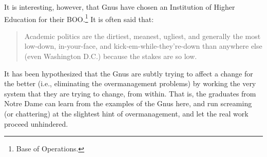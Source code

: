 It is interesting, however, that Gnus have chosen an Institution of
Higher Education for their BOO.\footnote{Base of Operations.}  It is
often said that:
\begin{quote}
  Academic politics are the dirtiest, meanest, ugliest, and generally
  the most low-down, in-your-face, and kick-em-while-they're-down than
  anywhere else (even Washington D.C.)  because the stakes are so low.
\end{quote}
It has been hypothesized that the Gnus are subtly trying to affect a
change for the better (i.e., eliminating the overmanagement problems)
by working the very system that they are trying to change, from
within.  That is, the graduates from Notre Dame can learn from the
examples of the Gnus here, and run screaming (or chattering) at the
slightest hint of overmanagement, and let the real work proceed
unhindered.

%
% 
% 